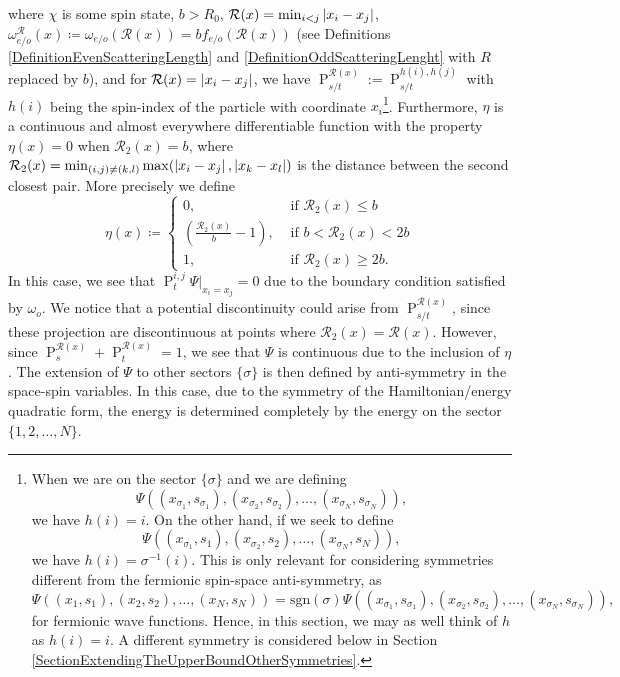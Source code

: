 where $ \chi $ is some spin state, $ b>R_0 $, $ \mathcal{R}(x)=\min_{i<j}\left\lvert x_i-x_j \right\rvert $, $ \omega^\mathcal{R}_{e/o}(x)\coloneqq \omega_{e/o}(\mathcal{R}(x))=bf_{e/o}(\mathcal{R}(x)) $ (see Definitions \ref{DefinitionEvenScatteringLength} and \ref{DefinitionOddScatteringLenght} with $R$ replaced by $b$), and for $\mathcal{R}(x)=\left\lvert x_i-x_j \right\rvert$, we have $ \operatorname{P}_{s/t}^{\mathcal{R}(x)}:=\operatorname{P}_{s/t}^{h(i),h(j)} $ with $h(i)$ being the spin-index of the particle with coordinate $x_i$\footnote{\label{FootnoteSpinProjection}When we are on the sector $ \{\sigma\} $ and we are defining $$ \Psi\left((x_{\sigma_1},s_{\sigma_1}),(x_{\sigma_2},s_{\sigma_2}),\ldots,(x_{\sigma_N},s_{\sigma_N})\right), $$ we have $h(i)=i$. On the other hand, if we seek to define $$\Psi\left((x_{\sigma_1},s_1),(x_{\sigma_2},s_2),\ldots,(x_{\sigma_N},s_N)\right),$$ we have $ h(i)=\sigma^{-1}(i) $. This is only relevant for considering symmetries different from the fermionic spin-space anti-symmetry, as $$
	\Psi\left((x_{1},s_{1}),(x_{2},s_{2}),\ldots,(x_{N},s_{N})\right)=\text{sgn}(\sigma)\Psi\left((x_{\sigma_1},s_{\sigma_1}),(x_{\sigma_2},s_{\sigma_2}),\ldots,(x_{\sigma_N},s_{\sigma_N})\right),
	$$
	for fermionic wave functions. Hence, in this section, we may as well think of $ h $ as $h(i)=i$.
	 A different symmetry is considered below in Section \ref{SectionExtendingTheUpperBoundOtherSymmetries}.}. Furthermore, $ \eta $ is a continuous and almost everywhere differentiable function with the property $ \eta(x)=0 $ when $ \mathcal{R}_2(x)=b $, where $ \mathcal{R}_2(x)=\min_{(i,j)\neq (k,l)}\max(\left\lvert x_i-x_j \right\rvert,\left\lvert x_k-x_l \right\rvert) $ is the distance between the second closest pair. More precisely we define
\begin{equation}
\eta(x)\coloneqq\begin{cases}
0,&\text{ if } \mathcal{R}_2(x)\leq b\\
\left(\frac{\mathcal{R}_2(x)}{b}-1\right), &\text{ if } b<\mathcal{R}_2(x)<2b\\
1, &\text{ if } \mathcal{R}_2(x)\geq 2b.
\end{cases}
\end{equation}
In this case, we see that $ \operatorname{P}_t^{i,j}\Psi\rvert_{x_i=x_j}=0 $ due to the boundary condition satisfied by $ \omega_o $. We notice that a potential discontinuity could arise from $ \operatorname{P}_{s/t}^{\mathcal{R}(x)} $, since these projection are discontinuous at points where $ \mathcal{R}_2(x)=\mathcal{R}(x) $. However, since $ \operatorname{P}_{s}^{\mathcal{R}(x)}+\operatorname{P}_{t}^{\mathcal{R}(x)}=1 $, we see that $ \Psi $ is continuous due to the inclusion of $ \eta $. The extension of $ \Psi $ to other sectors $ \{\sigma\} $ is then defined by anti-symmetry in the space-spin variables. In this case, due to the symmetry of the Hamiltonian/energy quadratic form, the energy is determined completely by the energy on the sector $ \{1,2,\ldots,N\} $.\\
